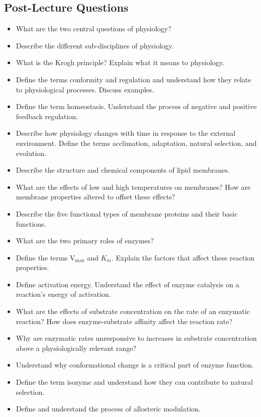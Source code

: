 \documentclass[12pt,a4paper]{article}
\begin{document}
\subsection{Post-Lecture Questions}
\begin{itemize}
    \item What are the two central questions of physiology? 
    \item Describe the different sub-disciplines of physiology.
    \item What is the Krogh principle? Explain what it means to physiology.
    \item Define the terms conformity and regulation and understand how they relate to physiological processes. Discuss examples.
    \item Define the term homeostasis. Understand the process of negative and positive feedback regulation.
    \item Describe how physiology changes with time in response to the external environment. Define the terms acclimation, adaptation, natural selection, and evolution.
    \item Describe the structure and chemical components of lipid membranes.
    \item What are the effects of low and high temperatures on membranes? How are membrane properties altered to offset these effects?
    \item Describe the five functional types of membrane proteins and their basic functions.
    \item What are the two primary roles of enzymes?
    \item Define the terms V\(_{\text{max}}\) and \(K_m\). Explain the factors that affect these reaction properties.
    \item Define activation energy. Understand the effect of enzyme catalysis on a reaction’s energy of activation.
    \item What are the effects of substrate concentration on the rate of an enzymatic reaction? How does enzyme-substrate affinity affect the reaction rate?
    \item Why are enzymatic rates unresponsive to increases in substrate concentration above a physiologically relevant range?
    \item Understand why conformational change is a critical part of enzyme function.
    \item Define the term isozyme and understand how they can contribute to natural selection.
    \item Define and understand the process of allosteric modulation.
\end{itemize}
\end{document}

